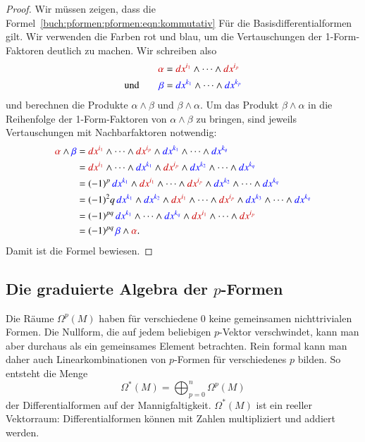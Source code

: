 \begin{proof}
Wir müssen zeigen, dass die
Formel~\eqref{buch:pformen:pformen:eqn:kommutativ}
Für die Basisdifferentialformen gilt.
Wir verwenden die Farben {\color{darkred}rot} und {\color{blue}blau},
um die Vertauschungen der 1-Form-Faktoren deutlich zu machen.
Wir schreiben also
\begin{align*}
{\color{darkred}\alpha}
&=
{\color{darkred}dx^{i_1}}
\wedge \dots \wedge
{\color{darkred}dx^{i_p}}
\\
\text{und}\qquad
{\color{blue}\beta}
&=
{\color{blue}dx^{k_1}}
\wedge \dots \wedge
{\color{blue}dx^{k_p}}
\end{align*}
und berechnen die Produkte $\alpha\wedge\beta$ und $\beta\wedge\alpha$.
Um das Produkt $\beta\wedge\alpha$ in die Reihenfolge der 1-Form-Faktoren
von $\alpha\wedge\beta$ zu bringen, sind jeweils Vertauschungen mit
Nachbarfaktoren notwendig:
\begin{align*}
{\color{darkred}\alpha}\wedge{\color{blue}\beta}
&=
{\color{darkred}dx^{i_1}}
\wedge\dots\wedge
{\color{darkred}dx^{i_p}}
\wedge
{\color{blue}dx^{k_1}}
\wedge\dots\wedge
{\color{blue}dx^{k_q}}
\\
&=
{\color{darkred}dx^{i_1}}
\wedge\dots\wedge
{\color{blue}dx^{k_1}}
\wedge
{\color{darkred}dx^{i_p}}
\wedge
{\color{blue}dx^{k_2}}
\wedge\dots\wedge
{\color{blue}dx^{k_q}}
\\
&=
(-1)^p
\,
{\color{blue}dx^{k_1}}
\wedge
{\color{darkred}dx^{i_1}}
\wedge\dots\wedge
{\color{darkred}dx^{i_p}}
\wedge
{\color{blue}dx^{k_2}}
\wedge\dots\wedge
{\color{blue} dx^{k_q}}
\\
&=
(-1)^2q
\,
{\color{blue}dx^{k_1}}
\wedge
{\color{blue}dx^{k_2}}
\wedge
{\color{darkred}dx^{i_1}}
\wedge\dots\wedge
{\color{darkred}dx^{i_p}}
\wedge
{\color{blue}dx^{k_3}}
\wedge\dots\wedge
{\color{blue} dx^{k_q}}
\\
&=
(-1)^{pq}
\,
{\color{blue}dx^{k_1}}
\wedge\dots\wedge
{\color{blue}dx^{k_q}}
\wedge
{\color{darkred}dx^{i_1}}
\wedge\dots\wedge
{\color{darkred}dx^{i_p}}
\\
&=
(-1)^{pq}
\,
{\color{blue}\beta}\wedge{\color{darkred}\alpha}.
\end{align*}
Damit ist die Formel bewiesen.
\end{proof}

%
%
\subsection{Die graduierte Algebra der $p$-Formen}
Die Räume $\Omega^p(M)$ haben für verschiedene $0$ keine gemeinsamen 
nichttrivialen Formen.
Die Nullform, die auf jedem beliebigen $p$-Vektor verschwindet, kann man
aber durchaus als ein gemeinsames Element betrachten.
Rein formal kann man daher auch Linearkombinationen von $p$-Formen für
verschiedenes $p$ bilden.
So entsteht die Menge
\[
\Omega^*(M)
=
\bigoplus_{p=0}^n \Omega^p (M)
\]
der Differentialformen auf der Mannigfaltigkeit.
$\Omega^*(M)$ ist ein reeller Vektorraum: Differentialformen können mit
Zahlen multipliziert und addiert werden.

